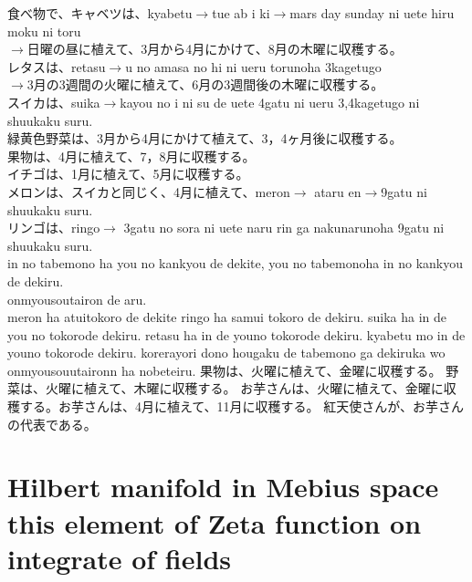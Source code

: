 \documentclass{jsarticle}
\begin{document}
食べ物で、キャベツは、kyabetu$\to$tue ab i ki$\to$mars day sunday ni uete hiru moku ni toru\\
$\to$日曜の昼に植えて、3月から4月にかけて、8月の木曜に収穫する。\\
レタスは、retasu$\to$u no amasa no hi ni ueru torunoha 3kagetugo\\
$\to$3月の3週間の火曜に植えて、6月の3週間後の木曜に収穫する。\\
スイカは、suika$\to$kayou no i ni su de uete 4gatu ni ueru 3,4kagetugo ni shuukaku suru.\\
緑黄色野菜は、3月から4月にかけて植えて、3，4ヶ月後に収穫する。\\
果物は、4月に植えて、7，8月に収穫する。\\
イチゴは、1月に植えて、5月に収穫する。\\
メロンは、スイカと同じく、4月に植えて、meron$\to$ ataru en$\to$9gatu ni shuukaku suru.\\
リンゴは、ringo$\to$ 3gatu no sora ni uete naru rin ga nakunarunoha 9gatu ni shuukaku suru.\\
in no tabemono ha you no kankyou de dekite, you no tabemonoha in no kankyou de dekiru.\\
onmyousoutairon de aru.\\
meron ha atuitokoro de dekite ringo ha samui tokoro de dekiru. suika ha in de you no 
tokorode dekiru. retasu ha in de youno tokorode dekiru. kyabetu mo in de youno tokorode dekiru.
korerayori dono hougaku de tabemono ga dekiruka wo onmyousouutaironn ha nobeteiru.
果物は、火曜に植えて、金曜に収穫する。
野菜は、火曜に植えて、木曜に収穫する。
お芋さんは、火曜に植えて、金曜に収穫する。お芋さんは、4月に植えて、11月に収穫する。
紅天使さんが、お芋さんの代表である。
 
\section{Hilbert manifold in Mebius space \\
        this element of Zeta function on integrate of fields}
\end{document}
